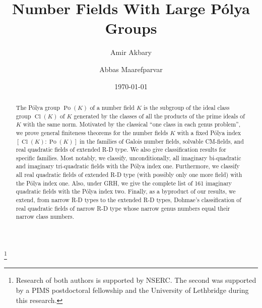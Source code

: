 \documentclass[12pt]{amsart}
\theoremstyle{definition}
\numberwithin{equation}{section}
\DeclareMathOperator{\Po}{Po}
\DeclareMathOperator{\Cl}{Cl}
\begin{document}
 






\title[Number Fields With Large P\'olya Groups]{Number Fields With Large P\'olya Groups} 

\author{Amir Akbary}
\address{Department of Mathematics and Computer Science, University of Lethbridge, Lethbridge, Alberta T1K 3M4, Canada}



\author{Abbas Maarefparvar} 
\address{Department of Mathematics and Computer Science, University of Lethbridge, Lethbridge, Alberta T1K 3M4, Canada} 





\thanks{Research of both authors is supported by NSERC. The second was supported by a PIMS postdoctoral fellowship and the University of Lethbridge during this research.} 




\date{\today} 






\begin{abstract} 
The P\'olya group $\Po(K)$ of a number field $K$ is the subgroup of the ideal class group $\Cl(K)$ of $K$ generated by the classes of all the products of the prime ideals of $K$ with the same norm.
Motivated by the classical ``one class in each genus problem'',
we prove general finiteness theorems for the number fields $K$ with a fixed P\'olya index $\left[\Cl(K):\Po(K)\right]$ in the families of Galois number fields, solvable CM-fields, and real quadratic fields of extended R-D type. We also give classification results for specific families. Most notably, we classify, unconditionally, all imaginary bi-quadratic and imaginary tri-quadratic fields with the P\'olya index one. Furthermore, 
we classify all real quadratic fields of extended R-D type (with possibly only one more field) with the P\'olya index one.
Also, under GRH, we give the complete list of 161 imaginary quadratic fields with the P\'olya index two. Finally, as a byproduct of our results, we extend, from narrow R-D types to the extended R-D types, Dohmae's classification of real quadratic fields of narrow R-D type whose narrow genus numbers equal their narrow class numbers.
\end{abstract} 
\maketitle 
\end{document}
